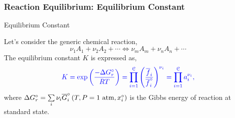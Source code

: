 \documentclass[10pt,compress,unknownkeysallowed]{beamer}
\begin{document}
\begin{frame}
  \frametitle{Reaction Equilibrium: Equilibrium Constant}
      \begin{block}{\begin{center}Equilibrium Constant\end{center}}
            Let's consider the generic chemical reaction,
               \begin{displaymath}
                   \nu_{1} A_{1} + \nu_{2} A_{2}  + \cdots  \Longleftrightarrow \nu_{m} A_{m} + \nu_{n} A_{n} + \cdots  
               \end{displaymath} 
            The equilibrium constant $K$ is expressed as,
               \begin{displaymath}
                  \blue{K = \exp\left(\frc{-\Delta G_{r}^{\circ}}{RT}\right) = \prod\limits_{i=1}^{\mathcal{C}}\left(\frc{\overline{f}_{i}}{\overline{f}_{i}^{\circ}}\right)^{\nu_{i}} = \prod\limits_{i=1}^{\mathcal{C}} a_{i}^{\nu_{i}},}
               \end{displaymath}
               where $\Delta G_{r}^{\circ}=\summation[\nu_{i}\overline{G}_{i}^{\circ}\left(T,P=1\text{ atm}, x_{i}^{\circ}\right)]{i}{}$ is the Gibbs energy of reaction at standard state.
      \end{block}

\end{frame}
\end{document}
